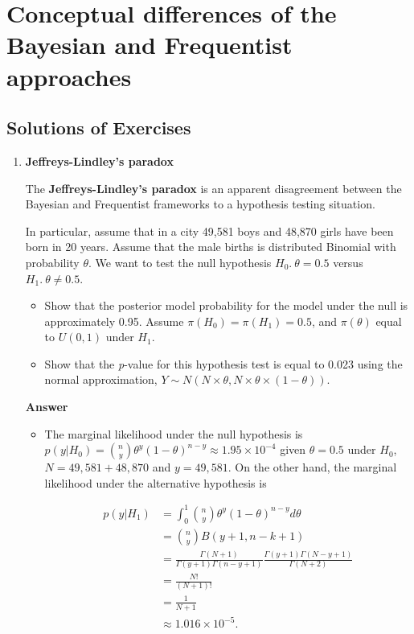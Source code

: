 \chapter{Conceptual differences of the Bayesian and Frequentist approaches}\label{chap2}
\section{Solutions of Exercises}\label{sec21}
\begin{enumerate}[leftmargin=*]
\item \textbf{Jeffreys-Lindley's paradox}

The \textbf{Jeffreys-Lindley's paradox} \cite{Jeffreys1961,lindley1957statistical} is an apparent disagreement between the Bayesian and Frequentist frameworks to a hypothesis testing situation.

In particular, assume that in a city 49,581 boys and 48,870 girls have been born in 20 years. Assume that the male births is distributed Binomial with probability $\theta$. We want to test the null hypothesis $H_0. \ \theta=0.5$ versus $H_1. \ \theta\neq 0.5$.

\begin{itemize}
	\item Show that the posterior model probability for the model under the null is approximately 0.95. Assume $\pi(H_0)=\pi(H_1)=0.5$, and $\pi(\theta)$ equal to ${U}(0,1)$ under $H_1$.
	\item Show that the \textit{p}-value for this hypothesis test is equal to 0.023 using the normal approximation, $Y\sim {N}(N\times \theta, N\times \theta \times (1-\theta))$. 
\end{itemize}

\textbf{Answer}

\begin{itemize}
	\item The marginal likelihood under the null hypothesis is $p(y|H_0)={n \choose y}\theta^y(1-\theta)^{n-y}\approx 1.95\times 10^{-4}$ given $\theta=0.5$ under $H_0$, $N=49,581+48,870$ and $y=49,581$. On the other hand, the marginal likelihood under the alternative hypothesis is

\begin{align*}
	p(y|H_1)&=\int_{0}^{1}{n \choose y}\theta^y(1-\theta)^{n-y}d\theta\\
	&={n \choose y} B(y+1, n-k+1)\\
	&=\frac{\Gamma(N+1)}{\Gamma(y+1)\Gamma(n-y+1)}\frac{\Gamma(y+1)\Gamma(N-y+1)}{\Gamma(N+2)}\\
	&=\frac{N!}{(N+1)!}\\
	&=\frac{1}{N+1}\\
	&\approx1.016\times 10^{-5}. 
\end{align*}


\end{itemize}
\end{enumerate}
